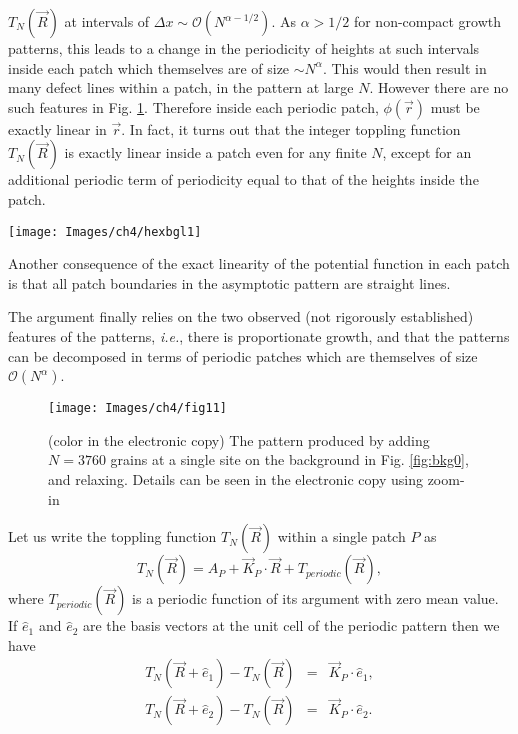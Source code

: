 \documentclass[11pt,a4paper]{book}
\begin{document}
$T_{N}(\vec R)$ at intervals of $\Delta x \sim
\mathcal{O}(N^{\alpha-1/2})$. As $\alpha>1/2$ for non-compact growth
patterns, this leads to a change in the periodicity of heights at such intervals
inside each patch which themselves are of size $\sim N^{\alpha}$. This
would then result in many defect lines within a patch, in the pattern at large $N$. However
there are no such features in Fig. \ref{fig:hexpicl1}.
Therefore inside each periodic patch,
$\phi(\vec r)$ must be exactly linear in $\vec r$. In fact, it turns out
that the integer toppling function $T_{N}(\vec R)$ is exactly linear inside
a patch even for any finite $N$, except for an additional periodic term of
periodicity equal to that of the heights inside the patch.
%
\begin{SCfigure}
\texttt{[image: Images/ch4/hexbgl1]}
\caption{The background of class I corresponding to $l=1$. The filled
circles represent height $z=1$ and unfilled ones $z=2$.}
\label{fig:bkg0}
\end{SCfigure}
%

Another consequence of the  exact linearity of the potential function in each
patch is that all patch boundaries in the asymptotic pattern  are straight lines.

The argument finally relies on the two observed (not rigorously
established) features of the
patterns, \textit{i.e.}, there is proportionate growth, and that the
patterns can be decomposed in terms of periodic patches which are
themselves of size $\mathcal{O}\left( N^{\alpha} \right)$.
%
\begin{figure}
\begin{center}
\texttt{[image: Images/ch4/fig11]}
\caption{(color in the electronic copy) The pattern produced by adding $N=3760$ grains at a single site
on the background in Fig. \ref{fig:bkg0}, and relaxing. Details can be
seen in the electronic copy using zoom-in}
\label{fig:hexpicl1}
\end{center}
\end{figure}
%

Let us write the toppling function $T_{N}(\vec R)$ within a single
patch $P$ as
\begin{equation}
T_{N}( \vec R )=A_P+\vec K_{P}\cdot
\vec R+T_{periodic}( \vec R ),
\label{eq:intT}
\end{equation}
where $T_{periodic}( \vec R )$ is a periodic function of
its argument with zero mean value. If $\hat{e}_{1}$ and
$\hat{e}_{2}$ are the basis vectors at the unit cell of the periodic
pattern then we have
\begin{eqnarray}
T_{N}( \vec R+\hat{e}_{1} )-T_{N}( \vec R)&=&\vec K_{P}\cdot
\hat{e}_{1},\nonumber \\
T_{N}( \vec R+\hat{e}_{2} )-T_{N}( \vec R )&=&\vec K_{P}\cdot
\hat{e}_{2}.
\end{eqnarray}
\end{document}
